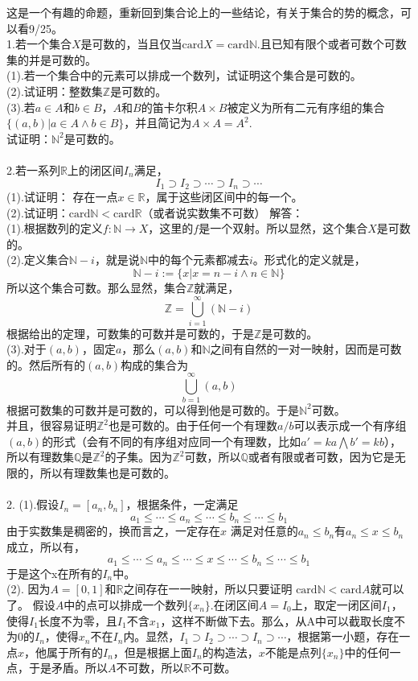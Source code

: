 \documentclass[11pt,a4paper,openany]{article}
\begin{document}
\indent 这是一个有趣的命题，重新回到集合论上的一些结论，有关于集合的势的概念，可以看9/25。\\
1.若一个集合$X$是可数的，当且仅当$\text{card}X=\text{card}\mathbb{N}$.且已知有限个或者可数个可数集的并是可数的。\\
(1).若一个集合中的元素可以排成一个数列，试证明这个集合是可数的。\\
(2).试证明：整数集$\mathbb{Z}$是可数的。\\
(3).若$a\in A$和$b\in B$，$A$和$B$的笛卡尔积$A\times B$被定义为所有二元有序组的集合$\{(a,b)|a\in A\wedge b\in B \}$，并且简记为$A\times A=A^2$.\\
试证明：$\mathbb{N}^2$是可数的。
\\
\\
2.若一系列$\mathbb{R}$上的闭区间$I_n$满足，
\[
I_1\supset I_2 \supset \cdots
\supset I_n \supset \cdots
\]
(1).试证明：
存在一点$x\in \mathbb{R}$，属于这些闭区间中的每一个。\\
(2).试证明：$\text{card}\mathbb{N}<\text{card}\mathbb{R}$（或者说实数集不可数）
\newpage
解答：\\
(1).根据数列的定义$f:\mathbb{N}\rightarrow X$，这里的$f$是一个双射。所以显然，这个集合$X$是可数的。\\
(2).定义集合$\mathbb{N}-i$，就是说$\mathbb{N}$中的每个元素都减去$i$。形式化的定义就是，
\[
\mathbb{N}-i:=
\{x|x=n-i\wedge n\in \mathbb{N}\}
\]
所以这个集合可数。那么显然，集合$\mathbb{Z}$就满足，\\
\[
\mathbb{Z}=\bigcup_{i=1}^{\infty}
\left(\mathbb{N}-i\right)
\]
根据给出的定理，可数集的可数并是可数的，于是$\mathbb{Z}$是可数的。\\
(3).对于$(a,b)$，固定$a$，那么$(a,b)$和$\mathbb{N}$之间有自然的一对一映射，因而是可数的。然后所有的$(a,b)$构成的集合为
\[
\bigcup_{b=1}^{\infty}(a,b)
\]
根据可数集的可数并是可数的，可以得到他是可数的。于是$\mathbb{N}^2$可数。
\\
\indent 并且，很容易证明$\mathbb{Z}^2$也是可数的。由于任何一个有理数$a/b$可以表示成一个有序组$(a,b)$的形式（会有不同的有序组对应同一个有理数，比如$a'=ka\bigwedge b'=kb$），所以有理数集$\mathbb{Q}$是$\mathbb{Z}^2$的子集。因为$\mathbb{Z}^2$可数，所以$\mathbb{Q}$或者有限或者可数，因为它是无限的，所以有理数集也是可数的。
\\
\\
2.
(1).假设$I_n=[a_n,b_n]$，根据条件，一定满足
\[
a_1 \leqslant \cdots \leqslant a_n \leqslant \cdots
\leqslant b_n \leqslant \cdots \leqslant b_1
\]
由于实数集是稠密的，换而言之，一定存在$x$ 满足对任意的$a_ n\leqslant b_n$有$a_ n\leqslant x\leqslant b_n$成立，所以有，
\[
a_1 \leqslant \cdots \leqslant a_n \leqslant \cdots \leqslant x  \leqslant \cdots
\leqslant b_n \leqslant \cdots \leqslant b_1
\]
于是这个x在所有的$I_n$中。\\
(2).
因为$A=[0,1]$和$\mathbb{R}$之间存在一一映射，所以只要证明
$\text{card}\mathbb{N}<\text{card} A$就可以了。
假设$A$中的点可以排成一个数列$\{x_n\}$.在闭区间$A=I_0$上，取定一闭区间$I_1$，使得$I_1$长度不为零，且$I_1$不含$x_1$，这样不断做下去。那么，从A中可以截取长度不为0的$I_n$，使得$x_n$不在$I_n$内。显然，$I_1\supset I_2 \supset \cdots
\supset I_n \supset \cdots$，根据第一小题，存在一点$x$，他属于所有的$I_n$，但是根据上面$I_n$的构造法，$x$不能是点列$\{x_n\}$中的任何一点，于是矛盾。所以$A$不可数，所以$\mathbb{R}$不可数。
\end{document}
